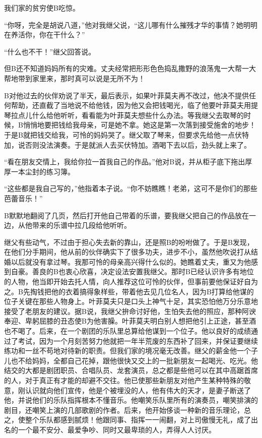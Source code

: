 \documentclass[12pt, UTF8]{ctexbook}
\begin{document}
\par 我们家的贫穷使B吃惊。
\par “你呀，完全是胡说八道，”他对我继父说，“这儿哪有什么摧残才华的事情？她明明在养活你，你在干什么？”
\par “什么也不干！”继父回答说。
\par 但B还不知道妈妈所有的灾难。丈夫经常把形形色色捣乱撒野的浪荡鬼一大帮一大帮地带到家里来，那时真可以说是无所不为！
\par B对他过去的伙伴劝说了半天，最后表示，如果叶菲莫夫再不改过，他决不提供任何帮助，还直截了当地说不给他钱，因为他又会把钱喝光，临了他要叶菲莫夫用提琴拉点儿什么给他听听，看看能为叶菲莫夫想些什么办法。等我继父去取琴的时候，B悄悄地要把钱给我母亲，可是她不拿。她这是第一次落到接受施舍的地步！于是B就把钱交给我，可怜的妈妈哭了。继父取了琴来，但要求先给他一点伏特加，说否则没法演奏。于是就派人去买伏特加。酒喝下去以后，劲头就上来了。
\par “看在朋友交情上，我给你拉一首我自己的作品。”他对B说，并从柜子底下拖出厚厚一本尘封的练习簿。
\par “这些都是我自己写的，”他指着本子说。“你不妨瞧瞧！老弟，这可不是你们的那些芭蕾音乐！”
\par B默默地翻阅了几页，然后打开他自己带着的乐谱，要我继父把自己的作品放在一边，从他带来的乐谱中拉几段给他听听。
\par 继父有些动气，不过由于担心失去新的靠山，还是照B的吩咐做了。于是B发现，在他们分手期间，他从前的伙伴确实下了很多功夫，进步不小，虽然他吹说打从结婚以后就没有拿过琴。我那可怜的母亲高兴得什么似的。她瞧着丈夫，重又为他感到自豪。善良的B也衷心欣喜，决定设法安置我继父。那时B已经认识许多有地位的人物，他当即开始去托人情，向人推荐这位可怜的伙伴，但事前要他保证好自为之。B先掏钱把他的衣着搞得象样些，带着他去见几位名人，因为B打算给他谋的位子关键在那些人物身上。叶菲莫夫只是口头上神气十足，其实恐怕他万分乐意地接受了老朋友的建议。据B说，我继父拚命讨好他，生怕失去他的照应，那种阿谀奉迎、卑躬屈膝的丑态使B为他害臊。叶菲莫夫明白别人想把他引上正途，甚至酒也不喝了。后来，在一个剧团的乐队里总算给他谋到一个位子。他以良好的成绩通过了考试，因为一个月刻苦努力他就把一年半荒废的东西补了回来，并保证要继续练功和一丝不苟地对待新的职责。但我们家的境况毫无改善。继父的薪金他一个子儿也不给妈妈，全都自己花掉，跟他很快又交上的一批新朋友一起喝光、吃光。他结交的大都是剧团职员、合唱队员、龙套演员，总之都是些他可以在其中高踞首席的人，对于真正有才能的却避不交往。他已使那些新朋友对他产生某种特殊的敬意，刚认识就向他们宣传，他是个被埋没的人，他有伟大的天才，是妻子断送了他，并说他们的乐队指挥根本不懂音乐。他嘲笑乐队里所有的演奏员，嘲笑排演的剧目，还嘲笑上演的几部歌剧的作者。后来，他开始侈谈一种新的音乐理论，总之，使整个乐队都感到腻烦！他跟同事、指挥一一闹翻，对上司傲慢无礼，成了出名的一个最不安分、最爱争吵、同时又最卑琐的人，弄得人人讨厌。
\end{document}
